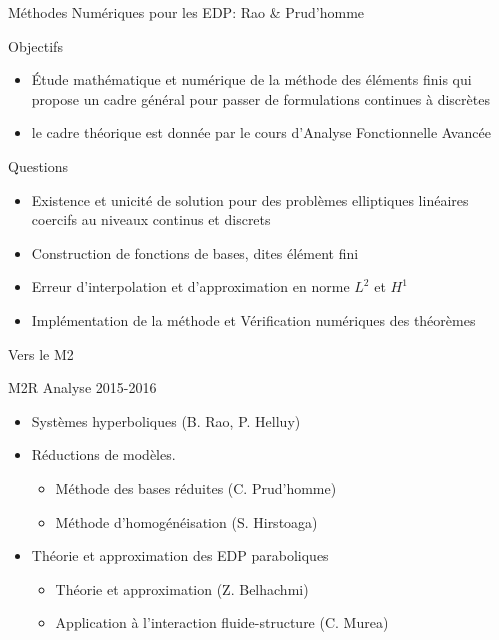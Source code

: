 \documentclass{beamer}
\begin{document}
\begin{frame}{Méthodes Numériques pour les EDP: Rao \& Prud'homme}
  \begin{block}{Objectifs}
    \begin{itemize}
    \item Étude mathématique et numérique de la méthode des éléments
      finis qui propose un cadre général pour passer de formulations
      continues à discrètes
    \item le cadre théorique est donnée par le cours d'Analyse
      Fonctionnelle Avancée
    \end{itemize}
  \end{block}
  \begin{block}{Questions}
    \begin{itemize}
    \item Existence et unicité de solution pour des problèmes
      elliptiques linéaires coercifs au niveaux continus et discrets
    \item Construction de fonctions de bases, dites élément fini
    \item Erreur d'interpolation et d'approximation en norme $L^2$ et $H^1$
    \item Implémentation de la méthode et Vérification numériques des théorèmes
    \end{itemize}
  \end{block}
\end{frame}

\begin{frame}{Vers le M2}

  \begin{block}{M2R Analyse 2015-2016}
    \begin{itemize}
    \item Systèmes hyperboliques (B. Rao, P. Helluy)
    \item Réductions de modèles.
      \begin{itemize}
      \item Méthode des bases réduites (C. Prud'homme)
      \item Méthode d'homogénéisation (S. Hirstoaga)
      \end{itemize}
    \item Théorie et approximation des EDP paraboliques
      \begin{itemize}
      \item Théorie et approximation (Z. Belhachmi)
      \item Application à l'interaction
        fluide-structure (C. Murea)
      \end{itemize}
    \end{itemize}
  \end{block}

\end{frame}
\end{document}
